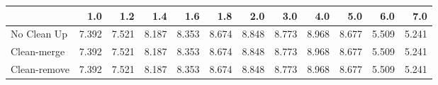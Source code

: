 \begin{tabular}{lrrrrrrrrrrr}
\toprule
{} &   1.0 &   1.2 &   1.4 &   1.6 &   1.8 &   2.0 &   3.0 &   4.0 &   5.0 &   6.0 &   7.0 \\
\midrule
No Clean Up  & 7.392 & 7.521 & 8.187 & 8.353 & 8.674 & 8.848 & 8.773 & 8.968 & 8.677 & 5.509 & 5.241 \\
Clean-merge  & 7.392 & 7.521 & 8.187 & 8.353 & 8.674 & 8.848 & 8.773 & 8.968 & 8.677 & 5.509 & 5.241 \\
Clean-remove & 7.392 & 7.521 & 8.187 & 8.353 & 8.674 & 8.848 & 8.773 & 8.968 & 8.677 & 5.509 & 5.241 \\
\bottomrule
\end{tabular}
